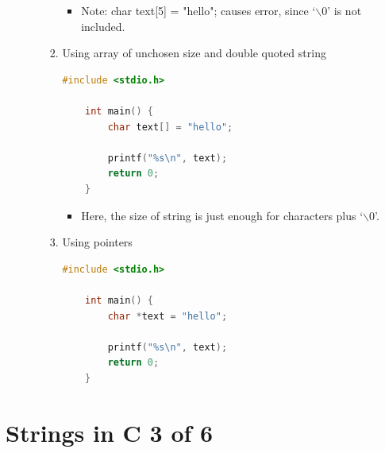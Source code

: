 \documentclass[12pt]{article}
\begin{document}
\begin{itemize}
\begin{itemize}
\begin{enumerate}[1.]
\begin{itemize}
                \item Note: char text[5] = "hello"; causes error, since `$\backslash0$'
                is not included.
            \end{itemize}

            \item Using array of unchosen size and double quoted string

    \begin{lstlisting}[language=c]
    #include <stdio.h>

    int main() {
        char text[] = "hello";

        printf("%s\n", text);
        return 0;
    }
    \end{lstlisting}

            \begin{itemize}
                \item Here, the size of string is just enough for characters plus `$\backslash0$'.
            \end{itemize}

            \item Using pointers


    \begin{lstlisting}[language=c]
    #include <stdio.h>

    int main() {
        char *text = "hello";

        printf("%s\n", text);
        return 0;
    }
    \end{lstlisting}

        \end{enumerate}
    \end{itemize}
\end{itemize}

\bigskip

\section*{Strings in C 3 of 6}

\bigskip
\end{document}
